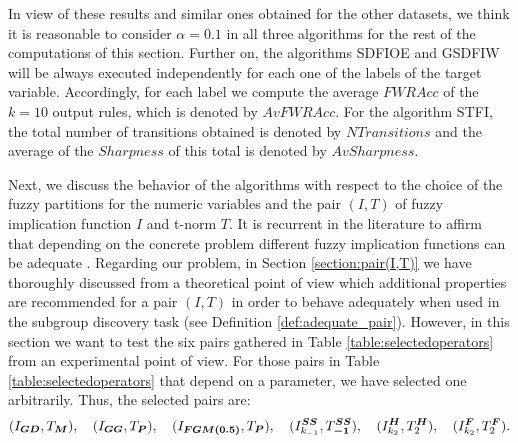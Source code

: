 In view of these results and similar ones obtained for the other datasets, we think it is reasonable to consider $\alpha=0.1$ in all three algorithms for the rest of the computations of this section. Further on, the algorithms SDFIOE and GSDFIW will be always executed independently for each one of the labels of the target variable. Accordingly, for each label we compute the average $FWRAcc$ of the $k=10$ output rules, which is denoted by $AvFWRAcc$. For the algorithm STFI, the total number of transitions obtained is denoted by $NTransitions$ and the average of the $Sharpness$ of this total is denoted by $AvSharpness$.

Next, we discuss the behavior of the algorithms with respect to the choice of the fuzzy partitions for the numeric variables and the pair $(I,T)$ of fuzzy implication function $I$ and t-norm $T$. It is recurrent in the literature to affirm that depending on the concrete problem different fuzzy implication functions can be adequate \cite{Trillas2008}. Regarding our problem, in Section \ref{section:pair(I,T)} we have thoroughly discussed from a theoretical point of view which additional properties are recommended for a pair $(I,T)$ in order to behave adequately when used in the subgroup discovery task (see Definition \ref{def:adequate_pair}). However, in this section we want to test the six pairs gathered in Table \ref{table:selectedoperators} from an experimental point of view.  For those pairs in Table \ref{table:selectedoperators} that depend on a parameter, we have selected one arbitrarily. Thus, the selected pairs are:
\begin{equation}\label{eq:six_pairs}
(I_{\bm{GD}},T_{\bm{M}}), \quad (I_{\bm{GG}},T_{\bm{P}}), \quad (I_{\bm{ FGM(0.5)}},T_{\bm{P}}), \quad (I^{\bm{SS}}_{k_{-1}},T_{\bm{-1}}^{\bm{SS}}), \quad (I^{\bm{H}}_{k_2},T_2^{\bm{H}}), \quad  (I^{\bm{F}}_{k_2},T_2^{\bm{F}}).
\end{equation}
